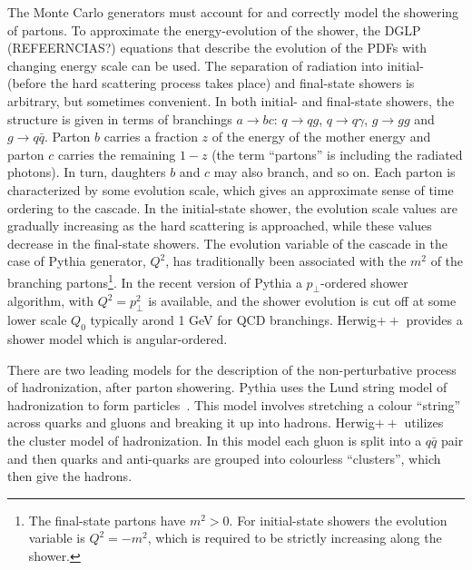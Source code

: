 The Monte Carlo generators must account for and correctly model the showering of partons. To approximate the energy-evolution of the shower, the DGLP (REFEERNCIAS?) equations that describe the evolution of the PDFs with changing energy scale can be used. The separation of radiation into initial- (before the hard scattering process takes place) and final-state showers is arbitrary, but sometimes convenient.  In both initial- and final-state showers, the structure is given in terms of branchings $a \rightarrow bc$: $q \rightarrow qg$, $q \rightarrow q\gamma$, $g \rightarrow gg$ and $g \rightarrow q\bar{q}$. Parton $b$ carries a fraction $z$ of the energy of the mother energy and parton $c$ carries the remaining $1-z$ (the term ``partons'' is including the radiated photons).  In turn, daughters $b$ and $c$ may also branch, and so on. Each parton is characterized by some evolution scale, which gives an approximate sense of time ordering to the cascade. In the initial-state shower,  the evolution scale values are gradually increasing as the hard scattering is approached, while  these values decrease in the final-state showers. The evolution variable of the cascade in the case of {\sc Pythia} generator, $Q^2$, has traditionally been associated with the $m^2$ of the branching partons\footnote{The final-state partons have $m^2>0$. For initial-state showers the evolution variable is $Q^2=-m^2$, which is required to be strictly increasing along the shower.}. In the recent version of {\sc Pythia} a $p_{\perp}$-ordered shower algorithm, with $Q^2=p_{\perp}^2$ is available, and the shower evolution is cut off at some lower scale  $Q_0$ typically arond 1 GeV for QCD branchings. {\sc Herwig}$++$ provides a shower model which is angular-ordered.

There are two leading models for the description of the non-perturbative process of hadronization, after parton showering. {\sc Pythia} uses the Lund string model of hadronization to form particles~\cite{LUNDMODEL}.  This model involves stretching a colour ``string'' across quarks and gluons and breaking it up into hadrons.%
{\sc Herwig}$++$ utilizes the cluster model of hadronization. In this model each gluon is split into a $q\bar{q}$ pair and then quarks and anti-quarks are grouped into colourless ``clusters'', which then give the hadrons.


